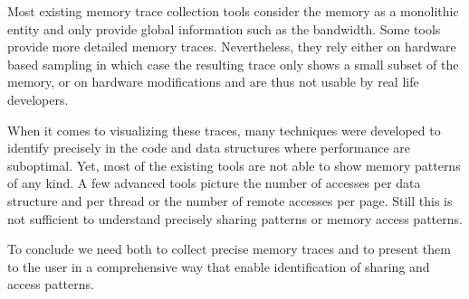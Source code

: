 Most existing memory trace collection tools consider the memory as a monolithic entity and only provide global information such as the bandwidth.
Some tools provide more detailed memory traces.
Nevertheless, they rely either on  hardware based sampling in which case the resulting trace only shows a small subset of the memory, or on hardware modifications and are thus not usable by real life developers.

When it comes to visualizing these traces, many techniques were developed to identify precisely in the code and data structures where performance are suboptimal.
Yet, most of the existing tools are not able to show memory patterns of any kind.
A few advanced tools picture the number of accesses per data structure and per thread or the number of remote accesses per page.
Still this is not sufficient to understand precisely sharing patterns or memory access patterns.

To conclude we need both to collect precise memory traces and to present them to the user in a comprehensive way that enable identification of sharing and access patterns.
